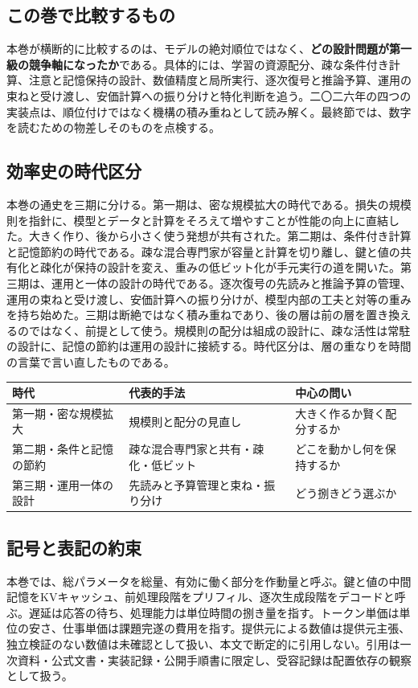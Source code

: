 \documentclass[lualatex,a4paper,10pt]{jlreq}
\begin{document}
\subsection*{この巻で比較するもの}
本巻が横断的に比較するのは、モデルの絶対順位ではなく、\textbf{どの設計問題が第一級の競争軸になったか}である。具体的には、学習の資源配分、疎な条件付き計算、注意と記憶保持の設計、数値精度と局所実行、逐次復号と推論予算、運用の束ねと受け渡し、安価計算への振り分けと特化判断を追う。二〇二六年の四つの実装点は、順位付けではなく機構の積み重ねとして読み解く。最終節では、数字を読むための物差しそのものを点検する。

\subsection*{効率史の時代区分}
本巻の通史を三期に分ける。第一期は、密な規模拡大の時代である。損失の規模則を指針に、模型とデータと計算をそろえて増やすことが性能の向上に直結した。大きく作り、後から小さく使う発想が共有された。第二期は、条件付き計算と記憶節約の時代である。疎な混合専門家が容量と計算を切り離し、鍵と値の共有化と疎化が保持の設計を変え、重みの低ビット化が手元実行の道を開いた。第三期は、運用と一体の設計の時代である。逐次復号の先読みと推論予算の管理、運用の束ねと受け渡し、安価計算への振り分けが、模型内部の工夫と対等の重みを持ち始めた。三期は断絶ではなく積み重ねであり、後の層は前の層を置き換えるのではなく、前提として使う。規模則の配分は組成の設計に、疎な活性は常駐の設計に、記憶の節約は運用の設計に接続する。時代区分は、層の重なりを時間の言葉で言い直したものである。

\begin{center}
\small
\begin{tabularx}{\textwidth}{@{}p{}p{}X@{}}
\toprule
時代 & 代表的手法 & 中心の問い \\
\midrule
第一期・密な規模拡大 & 規模則と配分の見直し & 大きく作るか賢く配分するか \\
第二期・条件と記憶の節約 & 疎な混合専門家と共有・疎化・低ビット & どこを動かし何を保持するか \\
第三期・運用一体の設計 & 先読みと予算管理と束ね・振り分け & どう捌きどう選ぶか \\
\bottomrule
\end{tabularx}
\end{center}

\subsection*{記号と表記の約束}
本巻では、総パラメータを総量、有効に働く部分を作動量と呼ぶ。鍵と値の中間記憶をKVキャッシュ、前処理段階をプリフィル、逐次生成段階をデコードと呼ぶ。遅延は応答の待ち、処理能力は単位時間の捌き量を指す。トークン単価は単位の安さ、仕事単価は課題完遂の費用を指す。提供元による数値は提供元主張、独立検証のない数値は未確認として扱い、本文で断定的に引用しない。引用は一次資料・公式文書・実装記録・公開手順書に限定し、受容記録は配置依存の観察として扱う。
\end{document}
